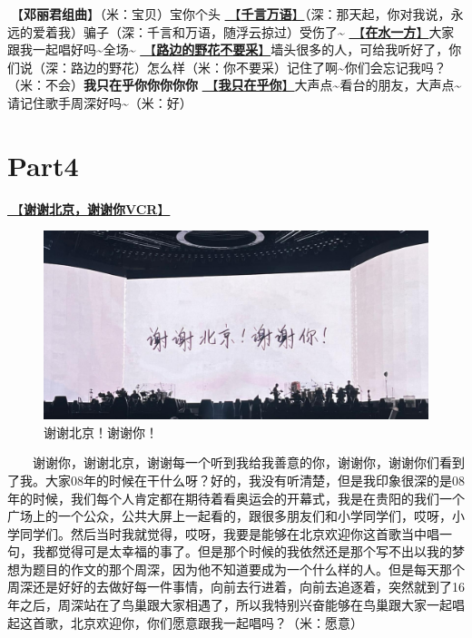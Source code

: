 \documentclass[]{ctexbook}
\begin{document}
🎵【\textbf{邓丽君组曲}】（米：宝贝）宝你个头
\hyperref[thousands-of-words]{🎵【\textbf{千言万语}】}（深：那天起，你对我说，永远的爱着我）骗子（深：千言和万语，随浮云掠过）受伤了\textasciitilde{}
\hyperref[on-the-water-side]{🎵【\textbf{在水一方}】}大家跟我一起唱好吗\textasciitilde 全场\textasciitilde{}
\hyperref[only-with-me]{🎵【\textbf{路边的野花不要采}】}墙头很多的人，可给我听好了，你们说（深：路边的野花）怎么样（米：你不要采）记住了啊\textasciitilde 你们会忘记我吗？（米：不会）\textbf{我只在乎你你你你你}
\hyperref[only-you]{🎵【\textbf{我只在乎你}】}大声点\textasciitilde 看台的朋友，大声点\textasciitilde 请记住歌手周深好吗\textasciitilde（米：好）

\section{Part4}\label{beijing-20240922-part4}

\hyperref[thank-you-vcr]{🎥【\textbf{谢谢北京，谢谢你VCR}】}

\begin{figure}

{\centering \includegraphics[width=400pt]{img/beijing20240921/thank-beijing} 

}

\caption{谢谢北京！谢谢你！}\label{fig:unnamed-chunk-107}
\end{figure}

  谢谢你，谢谢北京，谢谢每一个听到我给我善意的你，谢谢你，谢谢你们看到了我。大家08年的时候在干什么呀？好的，我没有听清楚，但是我印象很深的是08年的时候，我们每个人肯定都在期待着看奥运会的开幕式，我是在贵阳的我们一个广场上的一个公众，公共大屏上一起看的，跟很多朋友们和小学同学们，哎呀，小学同学们。然后当时我就觉得，哎呀，我要是能够在北京欢迎你这首歌当中唱一句，我都觉得可是太幸福的事了。但是那个时候的我依然还是那个写不出以我的梦想为题目的作文的那个周深，因为他不知道要成为一个什么样的人。但是每天那个周深还是好好的去做好每一件事情，向前去行进着，向前去追逐着，突然就到了16年之后，周深站在了鸟巢跟大家相遇了，所以我特别兴奋能够在鸟巢跟大家一起唱起这首歌，北京欢迎你，你们愿意跟我一起唱吗？（米：愿意）
\end{document}
